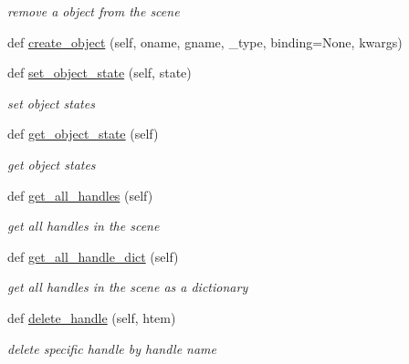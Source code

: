 \begin{DoxyCompactItemize}
\begin{DoxyCompactList}\small\item\em remove a object from the scene \end{DoxyCompactList}\item 
def \hyperlink{classrnb-planning_1_1src_1_1pkg_1_1planning_1_1scene_1_1_planning_scene_a9d1c4d08f156f553aeea9ef0b10e9a13}{create\+\_\+object} (self, oname, gname, \+\_\+type, binding=None, kwargs)
\item 
def \hyperlink{classrnb-planning_1_1src_1_1pkg_1_1planning_1_1scene_1_1_planning_scene_a155feb8b15ab783769968f94ac68b74b}{set\+\_\+object\+\_\+state} (self, state)
\begin{DoxyCompactList}\small\item\em set object states \end{DoxyCompactList}\item 
def \hyperlink{classrnb-planning_1_1src_1_1pkg_1_1planning_1_1scene_1_1_planning_scene_ab11688270b9c9c232046abb06d92e67e}{get\+\_\+object\+\_\+state} (self)
\begin{DoxyCompactList}\small\item\em get object states \end{DoxyCompactList}\item 
def \hyperlink{classrnb-planning_1_1src_1_1pkg_1_1planning_1_1scene_1_1_planning_scene_a4e2dcca2136fa3818eb718735dae3e19}{get\+\_\+all\+\_\+handles} (self)
\begin{DoxyCompactList}\small\item\em get all handles in the scene \end{DoxyCompactList}\item 
def \hyperlink{classrnb-planning_1_1src_1_1pkg_1_1planning_1_1scene_1_1_planning_scene_a6f25aae8ae537c6a619fcdff039a3044}{get\+\_\+all\+\_\+handle\+\_\+dict} (self)
\begin{DoxyCompactList}\small\item\em get all handles in the scene as a dictionary \end{DoxyCompactList}\item 
\mbox{\label{classrnb-planning_1_1src_1_1pkg_1_1planning_1_1scene_1_1_planning_scene_a00df9e2b30863bbb2dddf244e63ae216}} 
def \hyperlink{classrnb-planning_1_1src_1_1pkg_1_1planning_1_1scene_1_1_planning_scene_a00df9e2b30863bbb2dddf244e63ae216}{delete\+\_\+handle} (self, htem)
\begin{DoxyCompactList}\small\item\em delete specific handle by handle name \end{DoxyCompactList}\item 

\end{DoxyCompactItemize}
